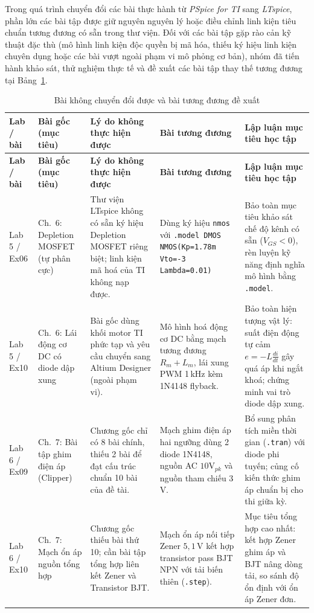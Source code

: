 \documentclass[12pt,a4paper]{article}
\newcommand{\hc}[1]{\cellcolor{navy}\color{white}\sffamily\bfseries\small #1}
\begin{document}
Trong quá trình chuyển đổi các bài thực hành từ \textit{PSpice for TI} sang \textit{LTspice}, phần lớn các bài tập được giữ nguyên nguyên lý hoặc điều chỉnh linh kiện tiêu chuẩn tương đương có sẵn trong thư viện. Đối với các bài tập gặp rào cản kỹ thuật đặc thù (mô hình linh kiện độc quyền bị mã hóa, thiếu ký hiệu linh kiện chuyên dụng hoặc các bài vượt ngoài phạm vi mô phỏng cơ bản), nhóm đã tiến hành khảo sát, thử nghiệm thực tế và đề xuất các bài tập thay thế tương đương tại Bảng~\ref{tab:tuongduong}.
{\small
\renewcommand{\arraystretch}{1.2}
\setlength{\tabcolsep}{4pt}
\begin{longtable}{|p{2.2cm}|p{3.3cm}|p{3.2cm}|p{2.7cm}|p{3.0cm}|}
\caption{Bài không chuyển đổi được và bài tương đương đề xuất}\label{tab:tuongduong}\\
\hline
\hc{Lab / bài} & \hc{Bài gốc (mục tiêu)} & \hc{Lý do không thực hiện được} & \hc{Bài tương đương} & \hc{Lập luận mục tiêu học tập}\\ \hline\endfirsthead
\hline
\hc{Lab / bài} & \hc{Bài gốc (mục tiêu)} & \hc{Lý do không thực hiện được} & \hc{Bài tương đương} & \hc{Lập luận mục tiêu học tập}\\ \hline\endhead
Lab 5 / Ex06 & Ch.~6: Depletion MOSFET (tự phân cực) & Thư viện LTspice không có sẵn ký hiệu Depletion MOSFET riêng biệt; linh kiện mã hoá của TI không nạp được. & Dùng ký hiệu \texttt{nmos} với \texttt{.model DMOS NMOS(Kp=1.78m Vto=-3 Lambda=0.01)} & Bảo toàn mục tiêu khảo sát chế độ kênh có sẵn ($V_{GS} < 0$), rèn luyện kỹ năng định nghĩa mô hình bằng \texttt{.model}. \\ \hline
Lab 5 / Ex10 & Ch.~6: Lái động cơ DC có diode dập xung & Bài gốc dùng khối motor TI phức tạp và yêu cầu chuyển sang Altium Designer (ngoài phạm vi). & Mô hình hoá động cơ DC bằng mạch tương đương $R_m + L_m$, lái xung PWM 1\,kHz kèm 1N4148 flyback. & Bảo toàn hiện tượng vật lý: suất điện động tự cảm $e = -L\frac{di}{dt}$ gây quá áp khi ngắt khoá; chứng minh vai trò diode dập xung. \\ \hline
Lab 6 / Ex09 & Ch.~7: Bài tập ghim điện áp (Clipper) & Chương gốc chỉ có 8 bài chính, thiếu 2 bài để đạt cấu trúc chuẩn 10 bài của đề tài. & Mạch ghim điện áp hai ngưỡng dùng 2 diode 1N4148, nguồn AC $10\text{V}_{pk}$ và nguồn tham chiếu 3\,V. & Bổ sung phân tích miền thời gian (\texttt{.tran}) với diode phi tuyến; củng cố kiến thức ghim áp chuẩn bị cho thi giữa kỳ. \\ \hline
Lab 6 / Ex10 & Ch.~7: Mạch ổn áp nguồn tổng hợp & Chương gốc thiếu bài thứ 10; cần bài tập tổng hợp liên kết Zener và Transistor BJT. & Mạch ổn áp nối tiếp Zener $5{,}1$\,V kết hợp transistor pass BJT NPN với tải biến thiên (\texttt{.step}). & Mục tiêu tổng hợp cao nhất: kết hợp Zener ghim áp và BJT nâng dòng tải, so sánh độ ổn định với ổn áp Zener đơn. \\ \hline
\end{longtable}}
\end{document}

